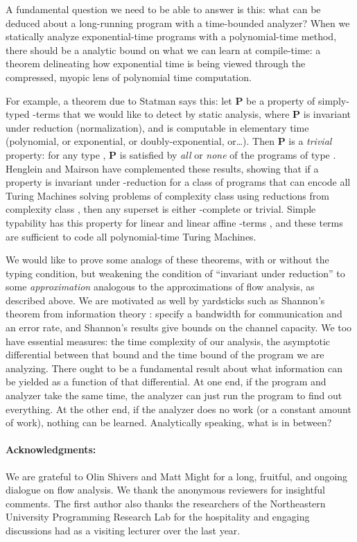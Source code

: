 \documentclass{llncs}
\begin{document}
A fundamental question we need to be able to answer is this: what can
be deduced about a long-running program with a time-bounded analyzer?
When we statically analyze exponential-time programs with a
polynomial-time method, there should be a analytic bound on what we
can learn at compile-time: a theorem delineating how exponential time
is being viewed through the compressed, myopic lens of polynomial time
computation.

For example, a theorem due to Statman \cite{statman} says this: let
{\bf P} be a property of simply-typed -terms that we would
like to detect by static analysis, where {\bf P} is invariant under
reduction (normalization), and is computable in elementary time
(polynomial, or exponential, or doubly-exponential, or\dots).  Then
{\bf P} is a {\em trivial} property: for any type , {\bf P} is
satisfied by {\em all} or {\em none} of the programs of type .
Henglein and Mairson \cite{henglein-mairson-popl91} have complemented
these results, showing that if a property is invariant under
-reduction for a class of programs that can encode all Turing
Machines solving problems of complexity class {} using
reductions from complexity class {}, then any superset is either
{}-complete or trivial.  Simple typability has this property for
linear and linear affine -terms
\cite{henglein-mairson-popl91,mairson-jfp04}, and these terms are
sufficient to code all polynomial-time Turing Machines.

We would like to prove some analogs of these theorems, with or without
the typing condition, but weakening the condition of ``invariant under
reduction'' to some {\em approximation} analogous to the
approximations of flow analysis, as described above.  We are motivated
as well by yardsticks such as Shannon's theorem from information
theory \cite{shannon}: specify a bandwidth for communication and an
error rate, and Shannon's results give bounds on the channel capacity.
We too have essential measures: the time complexity of our analysis,
the asymptotic differential between that bound and the time bound of
the program we are analyzing.  There ought to be a fundamental result
about what information can be yielded as a function of that
differential.  At one end, if the program and analyzer take the same
time, the analyzer can just run the program to find out everything.
At the other end, if the analyzer does no work (or a constant amount
of work), nothing can be learned.  Analytically speaking, what is in
between?



\paragraph{Acknowledgments:}

We are grateful to Olin Shivers and Matt Might for a long, fruitful,
and ongoing dialogue on flow analysis.  We thank the anonymous
reviewers for insightful comments.  The first author also thanks the
researchers of the Northeastern University Programming Research Lab
for the hospitality and engaging discussions had as a visiting
lecturer over the last year.


\end{document}
